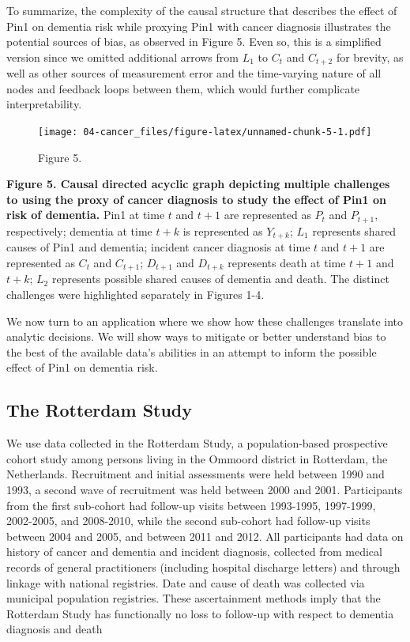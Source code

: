 \documentclass[
]{book}
\begin{document}
To summarize, the complexity of the causal structure that describes the effect of Pin1 on dementia risk while proxying Pin1 with cancer diagnosis illustrates the potential sources of bias, as observed in Figure 5. Even so, this is a simplified version since we omitted additional arrows from \(L_1\) to \(C_t\) and \(C_{t+2}\) for brevity, as well as other sources of measurement error and the time-varying nature of all nodes and feedback loops between them, which would further complicate interpretability\autocite{whatif2020}.

\begin{figure}
\centering
\texttt{[image: 04-cancer\_files/figure-latex/unnamed-chunk-5-1.pdf]}
\caption{\label{fig:unnamed-chunk-5}Figure 5.}
\end{figure}

\textbf{Figure 5. Causal directed acyclic graph depicting multiple challenges to using the proxy of cancer diagnosis to study the effect of Pin1 on risk of dementia.} Pin1 at time \(t\) and \(t+1\) are represented as \(P_t\) and \(P_{t+1}\), respectively; dementia at time \(t+k\) is represented as \(Y_{t+k}\); \(L_1\) represents shared causes of Pin1 and dementia; incident cancer diagnosis at time \(t\) and \(t+1\) are represented as \(C_t\) and \(C_{t+1}\); \(D_{t+1}\) and \(D_{t+k}\) represents death at time \(t+1\) and \(t+k\); \(L_2\) represents possible shared causes of dementia and death. The distinct challenges were highlighted separately in Figures 1-4.

We now turn to an application where we show how these challenges translate into analytic decisions. We will show ways to mitigate or better understand bias to the best of the available data's abilities in an attempt to inform the possible effect of Pin1 on dementia risk.

\hypertarget{the-rotterdam-study}{%
\subsection{The Rotterdam Study}\label{the-rotterdam-study}}

We use data collected in the Rotterdam Study, a population-based prospective cohort study among persons living in the Ommoord district in Rotterdam, the Netherlands. Recruitment and initial assessments were held between 1990 and 1993, a second wave of recruitment was held between 2000 and 2001. Participants from the first sub-cohort had follow-up visits between 1993-1995, 1997-1999, 2002-2005, and 2008-2010, while the second sub-cohort had follow-up visits between 2004 and 2005, and between 2011 and 2012\autocite{ikram2020}. All participants had data on history of cancer and dementia and incident diagnosis, collected from medical records of general practitioners (including hospital discharge letters) and through linkage with national registries. Date and cause of death was collected via municipal population registries. These ascertainment methods imply that the Rotterdam Study has functionally no loss to follow-up with respect to dementia diagnosis and death
\end{document}
